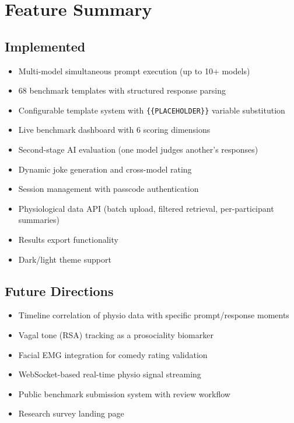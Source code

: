 \documentclass[11pt,a4paper]{article}
\begin{document}
\section{Feature Summary}

\subsection{Implemented}

\begin{itemize}[noitemsep]
  \item Multi-model simultaneous prompt execution (up to 10+ models)
  \item 68 benchmark templates with structured response parsing
  \item Configurable template system with \texttt{\{\{PLACEHOLDER\}\}} variable substitution
  \item Live benchmark dashboard with 6 scoring dimensions
  \item Second-stage AI evaluation (one model judges another's responses)
  \item Dynamic joke generation and cross-model rating
  \item Session management with passcode authentication
  \item Physiological data API (batch upload, filtered retrieval, per-participant summaries)
  \item Results export functionality
  \item Dark/light theme support
\end{itemize}

\subsection{Future Directions}

\begin{itemize}[noitemsep]
  \item Timeline correlation of physio data with specific prompt/response moments
  \item Vagal tone (RSA) tracking as a prosociality biomarker
  \item Facial EMG integration for comedy rating validation
  \item WebSocket-based real-time physio signal streaming
  \item Public benchmark submission system with review workflow
  \item Research survey landing page
\end{itemize}
\end{document}

